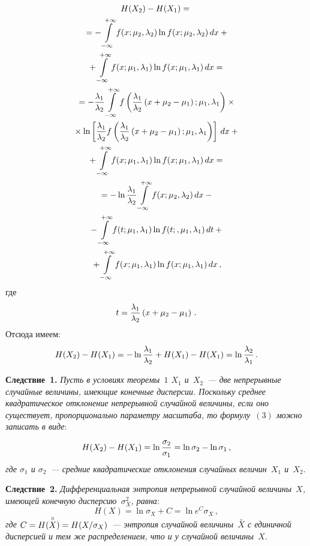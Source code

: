 \begin{multicols}{2}
\noindent
  \begin{multline*}
  H(X_2) -H(X_1) = {}\\
  {}= -\int\limits_{-\infty}^{+\infty} f(x;\mu_2,\lambda_2)\ln 
f(x;\mu_2,\lambda_2)\,dx
  +{}\\
  {}+ \int\limits_{-\infty}^{+\infty} f(x;\mu_1,\lambda_1)\ln 
f(x;\mu_1,\lambda_1)\,dx={}\\
  {}= -\displaystyle\frac{\displaystyle \lambda_1\mathstrut}{\displaystyle \lambda_2\mathstrut} \int\limits_{-\infty}^{+\infty} f\left( 
\displaystyle\frac{\displaystyle \lambda_1\mathstrut}{\displaystyle \lambda_2\mathstrut}\left( x+\mu_2-\mu_1\right);\mu_1,\lambda_1\right) \times{}\\
{}\times\ln 
\left[ \displaystyle\frac{\displaystyle \lambda_1\mathstrut}{\displaystyle \lambda_2\mathstrut}f \left( \displaystyle\frac{\displaystyle \lambda_1\mathstrut}{\displaystyle \lambda_2\mathstrut}\left( x+\mu_2-\mu_1\right);\mu_1,\lambda_1 
\right)\right]\,dx+{}\\
  {}+ \int\limits_{-\infty}^{+\infty} f(x;\mu_1,\lambda_1)\ln 
f(x;\mu_1,\lambda_1)\,dx= {}\\
{}=-\ln \displaystyle\frac{\displaystyle \lambda_1\mathstrut}{\displaystyle \lambda_2\mathstrut} \int\limits_{-
\infty}^{+\infty} f(x;\mu_2,\lambda_2)\,dx-{}\\
  {}- \int\limits_{-\infty}^{+\infty} f(t;\mu_1,\lambda_1)\ln 
f(t;,\mu_1,\lambda_1)\,dt +{}\\
{}+
  \int\limits_{-\infty}^{+\infty} f(x;\mu_1,\lambda_1)\ln 
f(x;\mu_1,\lambda_1)\,dx\,,
  \end{multline*}
  где 
  $$
  t=\displaystyle\frac{\displaystyle \lambda_1\mathstrut}{\displaystyle \lambda_2\mathstrut}\left( x+\mu_2-\mu_1\right)\,.
  $$ 
  Отсюда имеем:
  $$
  H(X_2)-H(X_1) =-\ln \displaystyle\frac{\displaystyle \lambda_1\mathstrut}{\displaystyle \lambda_2\mathstrut} + H(X_1) -H(X_1)=\ln 
\displaystyle\frac{\displaystyle \lambda_2\mathstrut}{\displaystyle \lambda_1\mathstrut}\,.
  $$
  
  \noindent
  \textbf{Следствие~1.} \textit{Пусть в условиях теоремы~$1$ $X_1$ 
и~$X_2$~--- две непрерывные случайные величины, имеющие конечные 
дисперсии. Поскольку среднее квадратическое отклонение непрерывной 
случайной величины, если оно существует, пропорционально параметру 
масштаба, то формулу~$(3)$ можно записать в виде}:
  \begin{equation}
  H(X_2)-H(X_1) =\ln \displaystyle\frac{\displaystyle \sigma_2\mathstrut}{\displaystyle \sigma_1\mathstrut}=\ln \sigma_2 -\ln \sigma_1\,,
  \label{e4-t}
  \end{equation}
  \textit{где $\sigma_1$ и $\sigma_2$~--- средние квадратические отклонения 
случайных величин~$X_1$ и~$X_2$}.
  
  \medskip
  
  \noindent
  \textbf{Следствие~2.} \textit{Дифференциальная энтропия непрерывной 
случайной величины~$X$, имеющей конечную дисперсию~$\sigma^2_X$, равна}:
   $$
   H(X)=\ln \sigma_X+C=\ln e^C\sigma_X\,,
   $$
  \textit{где $C\hm=H(\overset{\circ}{X})\hm= H(X/\sigma_X)$~--- энтропия 
случайной величины~$\overset{\circ}{X}$ с единичной дис\-пер\-си\-ей и тем же 
распределением, что и у случайной величины~$X$.}
  

\end{multicols}
